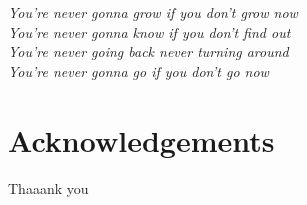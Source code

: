 

\begin{flushright}{\slshape    
You're never gonna grow if you don't grow now \\
You're never gonna know if you don't find out \\
You're never going back never turning around \\
You're never gonna go if you don't go now \\
}
\end{flushright}

\bigskip


\begingroup

\let\clearpage\relax
\let\cleardoublepage\relax
\let\cleardoublepage\relax

\chapter*{Acknowledgements}

\noindent Thaaank you

\endgroup

